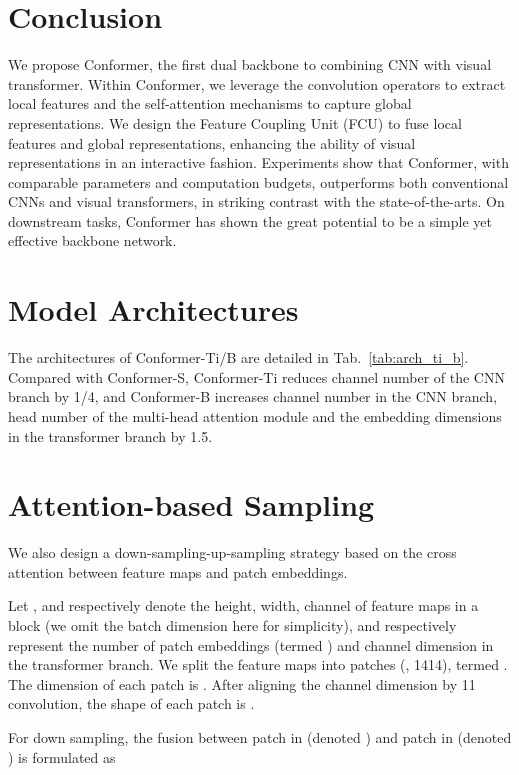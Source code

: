 \documentclass[10pt,twocolumn,letterpaper]{article}
\begin{document}
\section{Conclusion}

We propose Conformer, the first dual backbone to combining CNN with visual transformer. Within Conformer, we leverage the convolution operators to extract local features and the self-attention mechanisms to capture global representations. We design the Feature Coupling Unit (FCU) to fuse local features and global representations, enhancing the ability of visual representations in an interactive fashion. Experiments show that Conformer, with comparable parameters and computation budgets, outperforms both conventional CNNs and visual transformers, in striking contrast with the state-of-the-arts. On downstream tasks, Conformer has shown the great potential to be a simple yet effective backbone network.

{\small


}

\appendix
\section{Model Architectures}
The architectures of Conformer-Ti/B are detailed in Tab.~\ref{tab:arch_ti_b}. 
Compared with Conformer-S, Conformer-Ti reduces channel number of the CNN branch by 1/4, and Conformer-B increases channel number in the CNN branch, head number of the multi-head attention module and the embedding dimensions in the transformer branch by 1.5. 

\section{Attention-based Sampling}
We also design a down-sampling-up-sampling strategy based on the cross attention between feature maps and patch embeddings.

Let ,  and  respectively denote the height, width, channel of feature maps in a block (we omit the batch dimension here for simplicity),  and  respectively represent the number of patch embeddings (termed ) and channel dimension in the transformer branch. We split the feature maps into  patches (, 1414), termed . The dimension of each patch is . 
After aligning the channel dimension by 11 convolution, the shape of each patch is .


For down sampling, the fusion between patch  in  (denoted ) and patch  in  (denoted ) is formulated as
\end{document}
